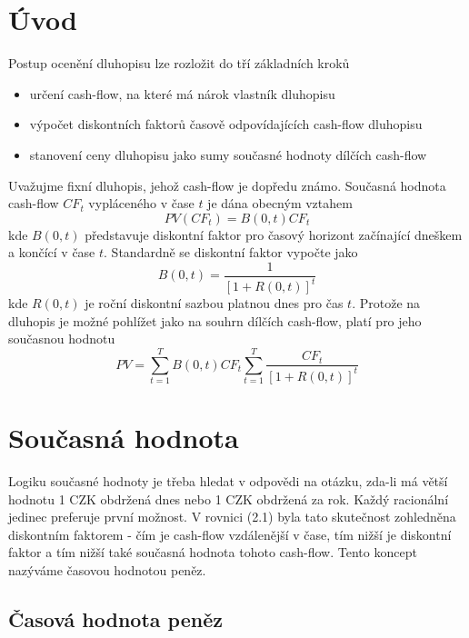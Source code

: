 \documentclass[a4paper]{book}
\begin{document}
\section{Úvod}

Postup ocenění dluhopisu lze rozložit do tří základních kroků
\begin{itemize}
\item určení cash-flow, na které má nárok vlastník dluhopisu
\item výpočet diskontních faktorů časově odpovídajících cash-flow dluhopisu
\item stanovení ceny dluhopisu jako sumy současné hodnoty dílčích cash-flow
\end{itemize}

Uvažujme fixní dluhopis, jehož cash-flow je dopředu známo. Současná hodnota cash-flow $CF_t$ vypláceného v čase $t$ je dána obecným vztahem
\begin{equation*}
PV(CF_t) = B(0,t)CF_t
\end{equation*}
kde $B(0,t)$ představuje diskontní faktor pro časový horizont začínající dneškem a končící v čase $t$. Standardně se diskontní faktor vypočte jako
\begin{equation}
B(0,t) = \frac{1}{[1 + R(0,t)]^t}
\end{equation}
kde $R(0,t)$ je roční diskontní sazbou platnou dnes pro čas $t$. Protože na dluhopis je možné pohlížet jako na souhrn dílčích cash-flow, platí pro jeho současnou hodnotu
\begin{equation}
PV = \sum_{t = 1}^T B(0,t)CF_t \sum_{t = 1}^T \frac{CF_t}{[1 + R(0,t)]^t}
\end{equation}

\section{Současná hodnota}

Logiku současné hodnoty je třeba hledat v odpovědi na otázku, zda-li má větší hodnotu 1 CZK obdržená dnes nebo 1 CZK obdržená za rok. Každý racionální jedinec preferuje první možnost. V rovnici (2.1) byla tato skutečnost zohledněna diskontním faktorem - čím je cash-flow vzdálenější v čase, tím nižší je diskontní faktor a tím nižší také současná hodnota tohoto cash-flow. Tento koncept nazýváme časovou hodnotou peněz.

\subsection{Časová hodnota peněz}
\end{document}
